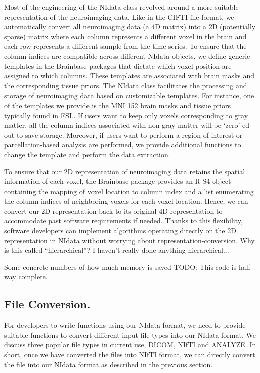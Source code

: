 \documentclass{nature}
\begin{document}
Most of the engineering of the NIdata class revolved around a more suitable
representation of the neuroimaging data. Like in the CIFTI file
format\cite{Glasser2013The},
we automatically convert all neuroimaging data (a 4D matrix) 
into a 2D (potentially sparse) matrix where each
column represents a different voxel 
in the brain and each row represents 
a different sample from the time series. To ensure that the column indices are
compatible across different NIdata objects, we define generic templates in the
Brainbase packages that dictate which voxel position are assigned to which
columns.
These templates are associated with brain masks and the corresponding tissue
priors.
The NIdata class facilitates the processing
and storage of neuroimaging data based on customizable
templates. 
For instance, one of the templates we provide is the MNI 152 brain masks and 
tissue priors typically found in FSL.
If users want to keep only voxels corresponding to gray matter, all the column
indices associated with non-gray matter will be `zero'-ed out to save storage.
Moreover, if users want to perform a
region-of-interest or parcellation-based analysis are performed, we provide
additional functions to change the template and perform the data extraction.

To ensure that our 2D representation of neuroimaging data retains the
spatial information of each voxel, the Brainbase package provides 
an R S4 object containing the mapping of voxel location to column index and
a list enumerating the column indices of neighboring voxels for each voxel
location. Hence, we can convert our 2D representation back to its original
4D representation to accommodate past software requirements if needed.
Thanks to this flexibility, software developers can 
implement algorithms operating directly on the 2D representation in
NIdata without worrying about representation-conversion. {\color{red}Why is this
called ``hierarchical''? I haven't really done anything hierarchical...}

{\color{red}Some concrete numbers of how much memory is saved}
{\color{red}TODO: This code is half-way complete.}

\subsection{File Conversion.} 
For developers to write functions using our NIdata format, we need to provide
suitable functions to convert different input file types into our NIdata format.
We discuss three popular file types in current use, DICOM, NIfTI and ANALYZE.
In short, once we have converted the files into NIfTI format, we can directly
convert the file into our NIdata format as described in the previous section.
\end{document}
